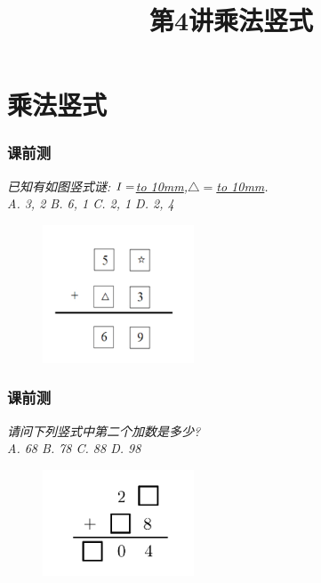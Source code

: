 \section{乘法竖式}

\title[第4讲\quad 乘法竖式]{第4讲\quad 乘法竖式} 
\author{}
\date{}
\begin{frame}
    \titlepage
\end{frame}

\begin{frame}
    \frametitle{课前测}
    \textit{已知有如图竖式谜: $\ding{73} =$\underline{\hbox to 10mm{}},$\triangle =$\underline{\hbox to 10mm{}}.\\
    A. 3, 2\qquad 
    B. 6, 1\qquad 
    C. 2, 1\qquad
    D. 2, 4}
    \begin{figure}[H] 
        \centering
        \includegraphics[width=0.4\textwidth]{./pics/Chapter_4/keqian1.png}
    \end{figure}
\end{frame}

\begin{frame}
    \frametitle{课前测}
    \textit{请问下列竖式中第二个加数是多少?\\
    A. 68\qquad 
    B. 78\qquad 
    C. 88\qquad
    D. 98}
    \begin{figure}[H] 
        \centering
        \includegraphics[width=0.4\textwidth]{./pics/Chapter_4/keqian2.png}
    \end{figure}
\end{frame}

